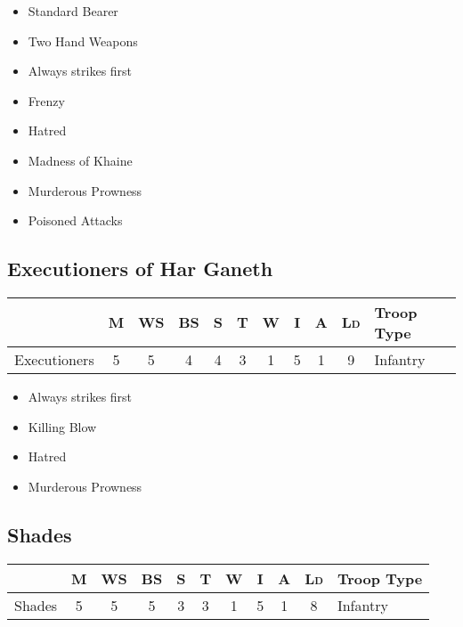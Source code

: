 \vspace{1em}

\begin{minipage}[t]{0.4\textwidth}
\begin{itemize}[noitemsep,nolistsep]
\item Standard Bearer\hyperref[rule:]{}
\item Two Hand Weapons
\item Always strikes first
\item Frenzy
\end{itemize}
\end{minipage}
\begin{minipage}[t]{0.4\textwidth}
\begin{itemize}[noitemsep,nolistsep]
\item Hatred
\item Madness of Khaine
\item Murderous Prowness
\item Poisoned Attacks
\end{itemize}
\end{minipage}



\subsection*{\dragon Executioners of Har Ganeth}
\marginpar{}
\begin{tabular}{lcccccccccl}
\toprule  
&
\textsc{M}&
\textsc{WS}&
\textsc{BS}&
\textsc{S}&
\textsc{T}&
\textsc{W}&
\textsc{I}&
\textsc{A}&
\textsc{Ld}& Troop Type\\ \midrule
Executioners & 5 & 5 & 4 & 4 & 3 & 1 & 5 & 1 & 9 & Infantry \\
\bottomrule
\end{tabular}

\vspace{1em}
\begin{itemize}[noitemsep,nolistsep]
\item Always strikes first
\item Killing Blow
\item Hatred
\item Murderous Prowness
\end{itemize}

\subsection*{\dragon Shades}
\marginpar{}
\begin{tabular}{lcccccccccl}
\toprule  
&
\textsc{M}&
\textsc{WS}&
\textsc{BS}&
\textsc{S}&
\textsc{T}&
\textsc{W}&
\textsc{I}&
\textsc{A}&
\textsc{Ld}& Troop Type\\ \midrule
Shades & 5 & 5 & 5 & 3 & 3 & 1 & 5 & 1 & 8 & Infantry\\
\bottomrule
\end{tabular}

